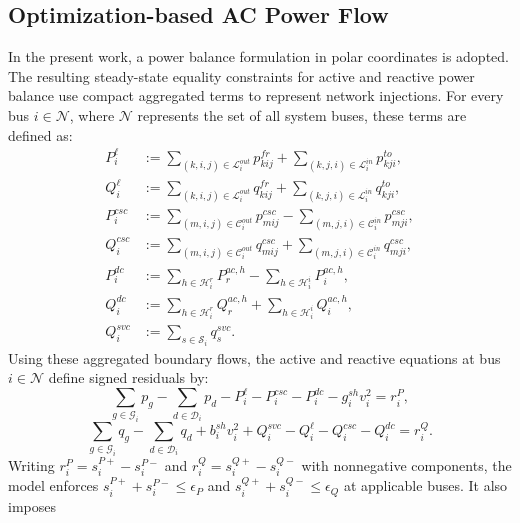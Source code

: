 \documentclass[letterpaper,journal]{IEEEtran}
\begin{document}
\subsection{Optimization-based AC Power Flow}
\label{sec:OB-ACPF}
In the present work, a power balance formulation in polar coordinates is adopted. The resulting steady-state equality constraints for active
and reactive power balance use compact aggregated terms to represent network injections. For every bus $i \in \mathcal{N}$, where $\mathcal{N}$
represents the set of all system buses, these terms are defined as:
\begin{align}
	P_i^{\ell} & := \sum_{(k,i,j)\in\mathcal{L}_i^{out}} p^{fr}_{kij} + \sum_{(k,j,i)\in\mathcal{L}_i^{in}}  p^{to}_{kji},   \\
	Q_i^{\ell} & := \sum_{(k,i,j)\in\mathcal{L}_i^{out}} q^{fr}_{kij} + \sum_{(k,j,i)\in\mathcal{L}_i^{in}}  q^{to}_{kji},   \\
	P_i^{csc}  & := \sum_{(m,i,j)\in\mathcal{C}_i^{out}} p^{csc}_{mij} - \sum_{(m,j,i)\in\mathcal{C}_i^{in}}  p^{csc}_{mji}, \\
	Q_i^{csc}  & := \sum_{(m,i,j)\in\mathcal{C}_i^{out}} q^{csc}_{mij} + \sum_{(m,j,i)\in\mathcal{C}_i^{in}}  q^{csc}_{mji}, \\
	P_i^{dc}   & := \sum_{h\in\mathcal{H}_i^{r}} P^{ac,h}_{r} - \sum_{h\in\mathcal{H}_i^{i}} P^{ac,h}_{i},                   \\
	Q_i^{dc}   & := \sum_{h\in\mathcal{H}_i^{r}} Q^{ac,h}_{r} + \sum_{h\in\mathcal{H}_i^{i}} Q^{ac,h}_{i},                   \\
	Q_i^{svc}  & := \sum_{s\in\mathcal{S}_i} q^{svc}_s.
\end{align}
Using these aggregated boundary flows, the active and reactive equations at bus $i \in \mathcal{N}$ define signed residuals by:
\begin{equation}
	\label{eq:power_flow_1}
	\sum_{g\in\mathcal{G}_i} p_g - \sum_{d\in\mathcal{D}_i} p_d - P_i^{\ell} - P_i^{csc} - P_i^{dc} - g_i^{sh}v_i^2 = r_i^P,
\end{equation}
\begin{equation}
	\label{eq:power_flow_2}
	\sum_{g\in\mathcal{G}_i} q_g - \sum_{d\in\mathcal{D}_i} q_d + b_i^{sh}v_i^2 + Q_i^{svc} - Q_i^{\ell} - Q_i^{csc} - Q_i^{dc} = r_i^Q.
\end{equation}
Writing $r_i^P=s_i^{P+}-s_i^{P-}$ and $r_i^Q=s_i^{Q+}-s_i^{Q-}$ with nonnegative components, the model enforces
$s_i^{P+}+s_i^{P-}\leq\epsilon_P$ and $s_i^{Q+}+s_i^{Q-}\leq\epsilon_Q$ at applicable buses. It also imposes
\end{document}
